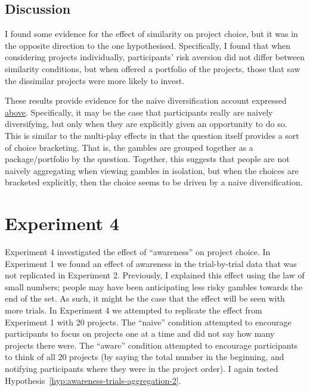 \documentclass[a4paper, nobind, dvipsnames]{templates/ociamthesis}
\theoremstyle{definition}
\theoremstyle{definition}
\theoremstyle{definition}
\theoremstyle{definition}
\theoremstyle{remark}
\begin{document}
\subsection{Discussion}

I found some evidence for the effect of similarity on project choice, but it was
in the opposite direction to the one hypothesised. Specifically, I found that
when considering projects individually, participants' risk aversion did not
differ between similarity conditions, but when offered a portfolio of the
projects, those that saw the dissimilar projects were more likely to invest.

These results provide evidence for the naive diversification account expressed
\protect\hyperlink{similarity-discussion-aggregation-1}{above}. Specifically, it may be the case
that participants really are naively diversifying, but only when they are
explicitly given an opportunity to do so. This is similar to the multi-play
effects in that the question itself provides a sort of choice bracketing. That
is, the gambles are grouped together as a package/portfolio by the question.
Together, this suggests that people are not naively aggregating when viewing
gambles in isolation, but when the choices are bracketed explicitly, then the
choice seems to be driven by a naive diversification.

\hypertarget{aggregation-4}{%
\section{Experiment 4}\label{aggregation-4}}

Experiment 4 investigated the effect of ``awareness'' on project choice. In
Experiment 1 we found an effect of awareness in the trial-by-trial data that was
not replicated in Experiment 2. Previously, I explained this effect using the
law of small numbers; people may have been anticipating less risky gambles
towards the end of the set. As such, it might be the case that the effect will
be seen with more trials. In Experiment 4 we attempted to replicate the effect
from Experiment 1 with 20 projects. The ``naive'' condition attempted to encourage
participants to focus on projects one at a time and did not say how many
projects there were. The ``aware'' condition attempted to encourage participants
to think of all 20 projects (by saying the total number in the beginning, and
notifying participants where they were in the project order). I again tested Hypothesis~\ref{hyp:awareness-trials-aggregation-2}.
\end{document}
